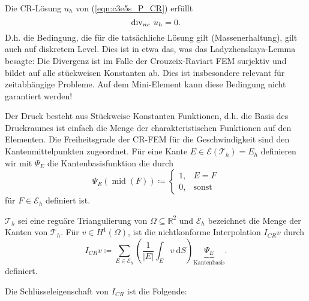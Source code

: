 \documentclass[../skript.tex]{subfiles}
\begin{document}
\begin{remark}\label{rem:c3e5s3}
	Die CR-Lösung $u_h$ von (\ref{eqn:c3e5s_P_CR}) erfüllt
	\[
		\operatorname{div}_{nc}\:u_h = 0.
	\]
	D.h. die Bedingung, die für die tatsächliche Lösung gilt (Massenerhaltung), gilt auch auf diskretem Level. Dies ist in etwa das, was das Ladyzhenskaya-Lemma besagte: Die Divergenz ist im Falle der Crouzeix-Raviart FEM surjektiv und bildet auf alle stückweisen Konstanten ab. Dies ist insbesondere relevant für zeitabhängige Probleme. Auf dem Mini-Element kann diese Bedingung nicht garantiert werden!
\end{remark}


\begin{remark}[Basis]\label{rem:c3e5s4}
	Der Druck besteht aus Stückweise Konstanten Funktionen, d.h. die Basis des Druckraumes ist einfach die Menge der charakteristischen Funktionen auf den Elementen.\newline\noindent
	Die Freiheitsgrade der CR-FEM für die Geschwindigkeit sind den Kantenmittelpunkten zugeordnet. Für eine Kante $E\in\mathcal{E}(\mathcal{T}_h)= E_h$ definieren wir mit $\Psi_E$ die Kantenbasisfunktion die durch
	\[
		\Psi_E(\operatorname{mid}(F)) \coloneqq \begin{cases}1,&E=F\\0,&\text{sonst}\end{cases}
	\]
	für $F\in\mathcal{E}_h$ definiert ist.
\end{remark}

\begin{definition}\label{def:c3e5s5}
	$\mathcal{T}_h$ sei eine reguäre Triangulierung von $\Omega\subseteq\mathbb{R}^2$ und $\mathcal{E}_h$ bezeichnet die Menge der Kanten von $\mathcal{T}_h$. Für $v\in H^1(\Omega)$, ist die nichtkonforme Interpolation $I_{CR}v$ durch 
	\[
		I_{CR}v \coloneqq \sum_{E\in\mathcal{E}_h} \left( \frac{1}{|E|} \int_E v\:\mathrm{d}S \right)\underbrace{\Psi_E}_{\text{Kantenbasis}}.
	\]
	definiert.
\end{definition}

Die Schlüsseleigenschaft von $I_{CR}$ ist die Folgende:
\end{document}
